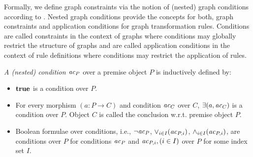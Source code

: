 Formally, we define graph constraints via the notion of (nested) graph conditions according to \cite{DBLP:journals/mscs/HabelP09}.
Nested graph conditions provide the concepts for both, graph constraints and application conditions for graph transformation rules.
Conditions are called constraints in the context of graphs where conditions may globally restrict the structure of graphs and are called application conditions in the context of rule definitions where conditions may restrict the application of rules.

\begin{definition}
\label{def:condition-satisfaction}
\emph{A (nested) condition $\mathit{ac}_P$} over a premise object $P$ is inductively defined by:
\begin{itemize}
	\item $\textbf{true}$ is a condition over $P$.
	\item For every morphism $(a \colon P \to C)$ and condition $\mathit{ac}_C$ over $C$, $\exists(a,\mathit{ac}_C)$ is a condition over $P$.
	Object $C$ is called the conclusion w.r.t. premise object $P$.
	\item Boolean formulae over conditions, i.e., $\neg\mathit{ac}_P$, $\vee_{i \in I} (\mathit{ac}_{P,i})$, $\wedge_{i \in I} (\mathit{ac}_{P,i})$, are conditions over $P$ for conditions $\mathit{ac}_P$ and $\mathit{ac}_{P,i},(i \in I)$ over $P$ for some index set $I$.
\end{itemize}


\end{definition}
